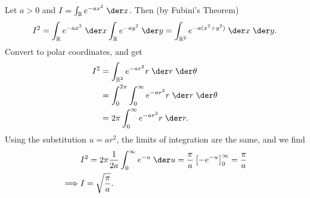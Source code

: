 \documentclass{homework}
\begin{document}
	\question Let \(a>0\) and \(I = \int_\mathbb{R} e^{-ax^2}\;\der x\). Then (by Fubini's Theorem)
	\begin{equation*}
		I^2 = \int_\mathbb{R}e^{-ax^2}\;\der x \int_\mathbb{R}e^{-ay^2}\;\der y =\int_{\mathbb{R}^2} e^{-a(x^2 + y^2)}\;\der x \;\der y.
	\end{equation*}
	Convert to polar coordinates, and get
	\begin{align*}
		I^2 &= \int_{\mathbb{R}^2} e^{-ar^2}r\;\der r \;\der \theta \\
		&= \int_0^{2\pi}\int_{0}^{\infty} e^{-ar^2}r\;\der r\;\der \theta \\
		&= 2\pi \int_{0}^{\infty}e^{-ar^2}r\;\der r.
	\end{align*}
	Using the substitution \(u = ar^2\), the limits of integration are the same, and we find
	\begin{equation*}
		\begin{split}
			&I^2 = 2 \pi \frac{1}{2a}\int_{0}^{\infty}e^{-u}\;\der u = \frac{\pi}{a}\left[-e^{-u}\right]_0^{\infty} = \frac{\pi}{a}\\
			\implies &I = \sqrt{\frac{\pi}{a}}.
		\end{split}
	\end{equation*}
\end{document}
